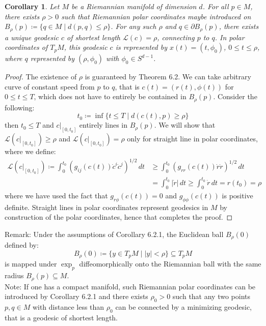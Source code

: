\documentclass[11pt]{book}
\theoremstyle{break}
\theoremstyle{break}
\newtheorem{corT}[lem]{Corollary}
\newcommand{\pd}{\partial}
\newcommand{\note}{\color{red}Note: \color{black}}
\newcommand{\remark}{\color{blue}Remark: \color{black}}
\begin{document}
\begin{corT}
Let $M$ be a Riemannian manifold of dimension $d$. For all $p \in M$, there exists $\rho>0$ such that Riemannian polar coordinates maybe introduced on $B_\rho(p) \coloneqq \{ q \in M\mid d(p,q) \leq \rho \}$. For any such $\rho$ and $q \in \pd B_\rho(p)$, there exists a unique geodesic $c$ of shortest length $\mathcal{L}(c) = \rho$, connecting $p$ to $q$. In polar coordinates of $T_pM$, this geodesic $c$ is represented by $x(t) = (t,\phi_0)$, $0\leq t\leq \rho$, where $q$ represented by $(\rho, \phi_0)$ with $\phi_0 \in S^{d-1}$.
\end{corT}
\begin{proof}
The existence of $\rho$ is guaranteed by Theorem 6.2. We can take arbitrary curve of constant speed from $p$ to $q$, that is $c(t) = (r(t) ,\phi(t))$ for $0\leq t\leq T$, which does not have to entirely be contained in $B_\rho(p)$. Consider the following:
$$t_0 \coloneqq \inf\{ t\leq T \mid d(c(t),p) \geq \rho\}$$ 
then $t_0\leq T$ and $c|_{[0,t_0]}$ entirely lines in $B_\rho(p)$. We will show that $\mathcal{L}(c|_{[0,t_0]}) \geq \rho$ and $\mathcal{L}(c|_{[0,t_0]}) = \rho$ only for straight line in polar coordinates, where we define:
\begin{align*}
\mathcal{L}(c|_{[0,t_0]}) \coloneqq \int_0^{t_0}\left( g_{ij}(c(t)) \dot{c}^i\dot{c}^j\right)^{1/2} \, dt 
&\geq \int_0^{t_0}\left( g_{rr}(c(t)) \dot{r}\dot{r}\right)^{1/2}\, dt \\
&= \int_0^{t_0}|\dot{r}| \, dt \geq \int_0^{t_0}\dot{r}\, dt = r(t_0) = \rho
\end{align*}
where we have used the fact that $g_{r\phi}(c(t)) = 0$ and $g_{\phi\phi}(c(t))$ is positive definite. Straight lines in polar coordinates represent geodesics in $M$ by construction of the polar coordinates, hence that completes the proof. 
\end{proof}
\remark Under the assumptions of Corollary 6.2.1, the Euclidean ball $B_\rho(0)$ defined by:
$$ B_\rho(0)\coloneqq \{ y \in T_pM \mid |y|<\rho\} \subseteq T_pM$$ is mapped under $\exp_p$ diffeomorphically onto the Riemannian ball with the same radius $B_\rho(p) \subseteq M$.\\


\note If one has a compact manifold, such Riemannian polar coordinates can be introduced by Corollary 6.2.1 and there exists $\rho_0 >0$ such that any two points $p,q \in M$ with distance less than $\rho_0$ can be connected by a minimizing geodesic, that is a geodesic of shortest length. \\
\end{document}
